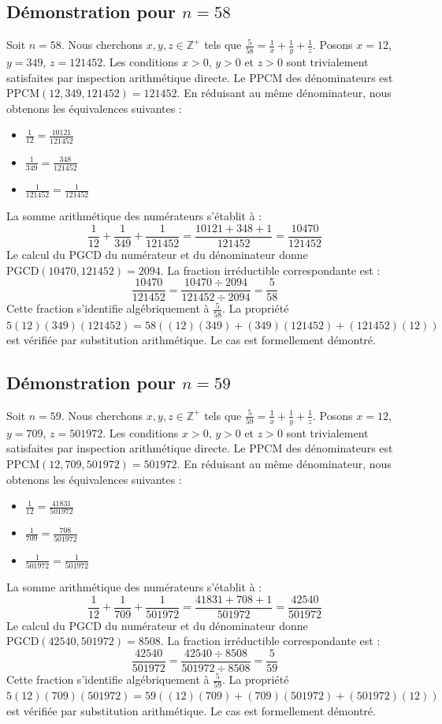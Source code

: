 \documentclass[12pt,a4paper]{article}
\begin{document}
\subsection{Démonstration pour $n = 58$}
Soit $n = 58$. Nous cherchons $x, y, z \in \mathbb{Z}^{+}$ tels que $\frac{5}{58} = \frac{1}{x} + \frac{1}{y} + \frac{1}{z}$.
Posons $x = 12$, $y = 349$, $z = 121452$.
Les conditions $x > 0$, $y > 0$ et $z > 0$ sont trivialement satisfaites par inspection arithmétique directe.
Le PPCM des dénominateurs est $\text{PPCM}(12, 349, 121452) = 121452$.
En réduisant au même dénominateur, nous obtenons les équivalences suivantes :
\begin{itemize}
    \item $\frac{1}{12} = \frac{10121}{121452}$
    \item $\frac{1}{349} = \frac{348}{121452}$
    \item $\frac{1}{121452} = \frac{1}{121452}$
\end{itemize}
La somme arithmétique des numérateurs s'établit à :
$$ \frac{1}{12} + \frac{1}{349} + \frac{1}{121452} = \frac{10121 + 348 + 1}{121452} = \frac{10470}{121452} $$
Le calcul du PGCD du numérateur et du dénominateur donne $\text{PGCD}(10470, 121452) = 2094$.
La fraction irréductible correspondante est :
$$ \frac{10470}{121452} = \frac{10470 \div 2094}{121452 \div 2094} = \frac{5}{58} $$
Cette fraction s'identifie algébriquement à $\frac{5}{58}$.
La propriété $5(12)(349)(121452) = 58((12)(349) + (349)(121452) + (121452)(12))$ est vérifiée par substitution arithmétique.
Le cas est formellement démontré.

\subsection{Démonstration pour $n = 59$}
Soit $n = 59$. Nous cherchons $x, y, z \in \mathbb{Z}^{+}$ tels que $\frac{5}{59} = \frac{1}{x} + \frac{1}{y} + \frac{1}{z}$.
Posons $x = 12$, $y = 709$, $z = 501972$.
Les conditions $x > 0$, $y > 0$ et $z > 0$ sont trivialement satisfaites par inspection arithmétique directe.
Le PPCM des dénominateurs est $\text{PPCM}(12, 709, 501972) = 501972$.
En réduisant au même dénominateur, nous obtenons les équivalences suivantes :
\begin{itemize}
    \item $\frac{1}{12} = \frac{41831}{501972}$
    \item $\frac{1}{709} = \frac{708}{501972}$
    \item $\frac{1}{501972} = \frac{1}{501972}$
\end{itemize}
La somme arithmétique des numérateurs s'établit à :
$$ \frac{1}{12} + \frac{1}{709} + \frac{1}{501972} = \frac{41831 + 708 + 1}{501972} = \frac{42540}{501972} $$
Le calcul du PGCD du numérateur et du dénominateur donne $\text{PGCD}(42540, 501972) = 8508$.
La fraction irréductible correspondante est :
$$ \frac{42540}{501972} = \frac{42540 \div 8508}{501972 \div 8508} = \frac{5}{59} $$
Cette fraction s'identifie algébriquement à $\frac{5}{59}$.
La propriété $5(12)(709)(501972) = 59((12)(709) + (709)(501972) + (501972)(12))$ est vérifiée par substitution arithmétique.
Le cas est formellement démontré.
\end{document}
